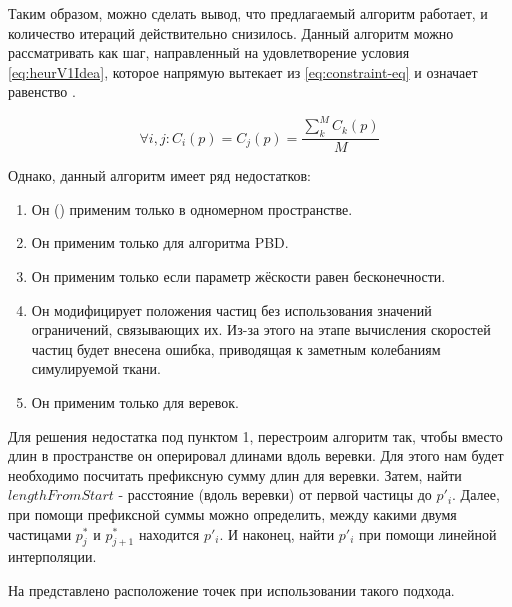 	Таким образом, можно сделать вывод, что предлагаемый алгоритм работает, и количество итераций действительно снизилось. Данный алгоритм можно рассматривать как шаг, направленный на удовлетворение условия \ref{eq:heurV1Idea}, которое напрямую вытекает из \ref{eq:constraint-eq} и означает равенство .
	
	\begin{equation} \label{eq:heurV1Idea}
		\forall i,j : C_i(p) = C_j(p) = \frac{\sum_k^M C_k(p)}{M}
	\end{equation}
	
	Однако, данный алгоритм имеет ряд недостатков:
	\begin{enumerate}[1.]
		\item Он () применим только в одномерном пространстве.
		\item Он применим только для алгоритма PBD.
		\item Он применим только если параметр жёскости равен бесконечности.
		\item Он модифицирует положения частиц без использования значений ограничений, связывающих их. Из-за этого на этапе вычисления скоростей частиц будет внесена ошибка, приводящая к заметным колебаниям симулируемой ткани.
		\item Он применим только для веревок.
	\end{enumerate}
	
	Для решения недостатка под пунктом 1, перестроим алгоритм так, чтобы вместо длин в пространстве он оперировал длинами вдоль веревки. Для этого нам будет необходимо посчитать префиксную сумму длин для веревки. Затем, найти $lengthFromStart$ - расстояние (вдоль веревки) от первой частицы до $p'_i$. Далее, при помощи префиксной суммы можно определить, между какими двумя частицами $p^*_j$ и $p^*_{j+1}$  находится $p'_i$. И наконец, найти $p'_i$ при помощи линейной интерполяции.
	
	На  представлено расположение точек при использовании такого подхода.
	
